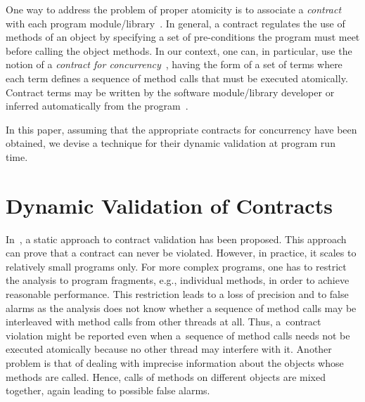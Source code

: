 \documentclass[runningheads]{llncs}
\begin{document}
One way to address the problem of proper atomicity is to associate a
\emph{contract} with each program module/library~\cite{contracts92}.
%
In general, a contract regulates the use of methods of an object by specifying a
set of pre-conditions the program must meet before calling the object methods.
%
In our context, one can, in particular, use the notion of a \emph{contract for
concurrency}~\cite{tr:2014:d_sousa}, having the form of a set of terms where
each term defines a sequence of method calls that must be executed atomically.  
%
%
Contract terms may be written by the software module/library developer or
inferred automatically from the program~\cite{tr:2014:d_sousa}. 
% 

%
In this paper, assuming that the appropriate contracts for concurrency have been
obtained, we devise a technique for their dynamic validation at program run
time.

\enlargethispage{6mm}

\vspace*{-2.5mm}\section{Dynamic Validation of Contracts}\vspace*{-1.5mm}

In~\cite{contract13,tr:2014:d_sousa}, a static approach to contract validation
has been proposed. This approach can prove that a contract can never be
violated. However, in practice, it scales to relatively small programs only. For
more complex programs, one has to restrict the analysis to program fragments,
e.g., individual methods, in order to achieve reasonable performance. This
restriction leads to a loss of precision and to false alarms as the analysis
does not know whether a sequence of method calls may be interleaved with method
calls from other threads at all. Thus, a~contract violation might be reported
even when a~sequence of method calls needs not be executed atomically because no
other thread may interfere with it.  Another problem is that of dealing with
imprecise information about the objects whose methods are called. Hence, calls
of methods on different objects are mixed together, again leading to possible
false alarms.
\end{document}
